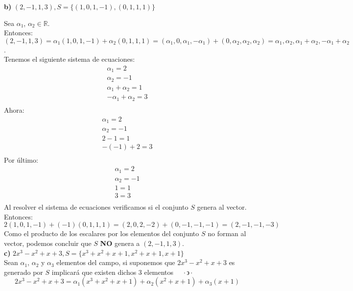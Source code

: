 \documentclass[letterpaper]{article}
\newcommand{\tq}{ \quad \cdot  \backepsilon \cdot \quad }
\renewcommand{\*}{\cdot}
\theoremstyle{definition}
\begin{document}
\noindent \textbf{b)} $(2,-1,1,3), S =  \lbrace (1,0,1,-1),(0,1,1,1) \rbrace$

Sea $\alpha _1$, $\alpha _2 \in \mathbb{R}$.\\
Entonces: $(2,-1,1,3)=\alpha_{1}(1,0,1,-1)+\alpha_{2}(0,1,1,1)= (\alpha_{1},0,\alpha_{1},-\alpha_{1})+(0,\alpha_{2},\alpha_{2},\alpha_{2})= \alpha_{1},\alpha_{2},\alpha_{1}+\alpha_{2},-\alpha_{1}+\alpha_{2}$.\\
Tenemos el siguiente sistema de ecuaciones:\\
\begin{align*}
\alpha_{1}=2\\
\alpha_{2} = -1\\
\alpha_{1}+\alpha_{2}=1\\
-\alpha_{1}+\alpha_{2}=3\\
\end{align*}
Ahora:\\
\begin{align*}
\alpha_{1}=2\\
\alpha_{2}= -1\\
2-1  =1\\
-(-1)+2 = 3\\
\end{align*}
Por último:
\begin{align*}
\alpha_{1}=2\\
\alpha_{2}=-1\\
1=1\\
3=3\\
\end{align*}
Al resolver el sistema de ecuaciones verificamos si el conjunto $S$ genera al vector. Entonces:
\[2(1,0,1,-1)+(-1)(0,1,1,1)=(2,0,2,-2)+(0,-1,-1,-1)=(2,-1,-1,-3)\]
Como el producto de los escalares por los elementos del conjunto $S$ no forman al vector, podemos concluir que $S$ \textbf{NO} genera a $(2,-1,1,3)$.\\

\textbf{c)} $2x^3 - x^2 + x + 3, S =  \lbrace x^3 + x^2 + x +1, x^2 + x +1, x +1 \rbrace$\\

Sean $\alpha_1 $, $\alpha_2$ y $\alpha_3$ elementos del campo, si suponemos que $2x^3 - x^2 + x + 3$ es generado por $S$ implicará que existen dichos 3 elementos $\tq$ 
\[ 2x^3 - x^2 + x + 3 = \alpha_1 (x^3 + x^2 + x +1) + \alpha_2 (x^2 + x +1) + \alpha_3 (x +1) \]
\end{document}
